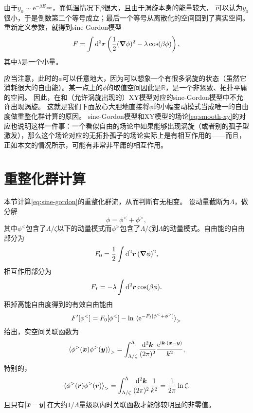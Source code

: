 \documentclass[hyperref, UTF8, a4paper]{ctexart}
\newcommand*{\ii}{\mathrm{i}}
\newcommand*{\ee}{\mathrm{e}}
\begin{document}
由于$y_0 \sim \ee^{- \beta E_\text{core}}$，而低温情况下$\beta$很大，且由于涡旋本身的能量较大， %
可以认为$y_0$很小，于是倒数第二个等号成立；最后一个等号从离散化的空间回到了真实空间。
重新定义参数，就得到sine-Gordon模型
\begin{equation}
    F = \int \dd[2]{\vb*{r}} \left( \frac{1}{2} (\grad{\phi})^2 - \lambda \cos(\beta \phi) \right),
    \label{eq:sine-gordon}
\end{equation}
其中$\lambda$是一个小量。

应当注意，此时的$\phi$可以任意地大，因为可以想象一个有很多涡旋的状态（虽然它消耗很大的自由能）。某一点上的$\phi$的取值空间因此是$\mathbb{R}$，是一个非紧致、拓扑平庸的空间。
因此，在和（允许涡旋出现的）XY模型对应的sine-Gordon模型中不允许出现涡旋。
这就是我们下面放心大胆地直接将$\phi$的小幅变动模式当成唯一的自由度做重整化群计算的原因。
sine-Gordon模型和XY模型的场论\eqref{eq:smooth-xy}的对应也说明这样一件事：一个看似自由的场论中如果能够出现涡旋（或者别的孤子型激发），那么这个场论对应的无拓扑孤子的场论实际上是有相互作用的——而且，正如本文的情况所示，可能有非常非平庸的相互作用。

\section{重整化群计算}

本节计算\eqref{eq:sine-gordon}的重整化群流，从而判断有无相变。
设动量截断为$\Lambda$，做分解
\[
    \phi = \phi^< + \phi^>,
\]
其中$\phi^<$包含了$\Lambda/\zeta$以下的动量模式而$\phi^>$包含了$\Lambda/\zeta$到$\Lambda$的动量模式。自由能的自由部分为
\[
    F_0 = \frac{1}{2} \int \dd[2]{\vb*{r}} (\grad{\phi})^2,
\]
相互作用部分为
\[
    F_I = - \lambda \int \dd[2]{\vb*{r}} \cos(\beta \phi).
\]
积掉高能自由度得到的有效自由能由
\[
    F'[\phi^<] = F_0[\phi^<] - \ln \expval*{\ee^{-F_I[\phi^< +  \phi^>]}}_>
\]
给出，实空间关联函数为
\[
    \expval*{\phi^>(\vb*{x}) \phi^>(\vb*{y})}_> = \int^\Lambda_{\Lambda/\zeta} \frac{\dd[2]{\vb*{k}}}{(2\pi)^2} \frac{\ee^{\ii \vb*{k} \cdot (\vb*{x} - \vb*{y})}}{k^2},
\]
特别的，
\[
    \expval*{\phi^>(\vb*{r}) \phi^>(\vb*{r})}_> = \int_{\Lambda/\zeta}^\Lambda \frac{\dd[2]{\vb*{k}}}{(2\pi)^2} \frac{1}{k^2} = \frac{1}{2\pi} \ln \zeta.
\]
且只有$\abs*{\vb*{x} - \vb*{y}}$在大约$1/\Lambda$量级以内时关联函数才能够较明显的非零值。
\end{document}
